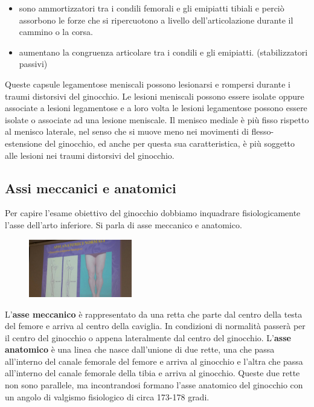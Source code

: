 \begin{itemize}
\item
  sono ammortizzatori tra i condili femorali e gli emipiatti tibiali e perciò assorbono le forze che si ripercuotono a livello dell'articolazione durante il cammino o la corsa.
\item
  aumentano la congruenza articolare tra i condili e gli emipiatti. (stabilizzatori passivi)
\end{itemize}

Queste capsule legamentose meniscali possono lesionarsi e rompersi durante i traumi distorsivi del ginocchio. Le lesioni meniscali possono essere isolate oppure associate a lesioni legamentose e a loro volta le lesioni legamentose possono essere isolate o associate ad una lesione meniscale. Il menisco mediale è più fisso rispetto al menisco laterale, nel senso che si muove meno nei movimenti di flesso-estensione del ginocchio, ed anche per questa sua caratteristica, è più soggetto alle lesioni nei traumi distorsivi del ginocchio.

\subsection{Assi meccanici e anatomici}

Per capire l'esame obiettivo del ginocchio dobbiamo inquadrare fisiologicamente l'asse dell'arto inferiore. Si parla di asse meccanico e anatomico.

\begin{figure}[!ht]
\centering
\includegraphics[width=0.4\textwidth]{008/image2.jpeg}
\end{figure}

L'\textbf{asse meccanico} è rappresentato da una retta che parte dal centro della testa del femore e arriva al centro della caviglia. In condizioni di normalità passerà per il centro del ginocchio o appena lateralmente dal centro del ginocchio.
L'\textbf{asse anatomico} è una linea che nasce dall'unione di due rette, una che passa all'interno del canale femorale del femore e arriva al ginocchio e l'altra che passa all'interno del canale femorale della
tibia e arriva al ginocchio. Queste due rette non sono parallele, ma incontrandosi formano l'asse anatomico del ginocchio con un angolo di valgismo fisiologico di circa 173-178 gradi.

